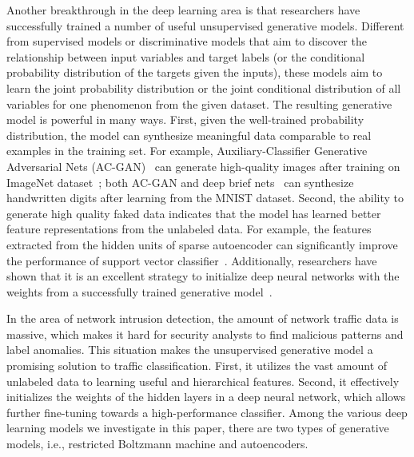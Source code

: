 Another breakthrough in the deep learning area is that researchers have successfully trained a number of useful unsupervised generative models.
Different from supervised models or discriminative models that aim to discover the relationship between input variables and target labels (or the conditional probability distribution of the targets given the inputs),
these models aim to learn the joint probability distribution or the joint conditional distribution of all variables for one phenomenon from the given dataset.
The resulting generative model is powerful in many ways.
First, given the well-trained probability distribution, the model can synthesize meaningful data comparable to real examples in the training set.
For example, Auxiliary-Classifier Generative Adversarial Nets (AC-GAN)~\cite{AC-GAN} can generate high-quality images after training on ImageNet dataset~\cite{ImageNet};
both AC-GAN and deep brief nets~\cite{DeepBeliefNets} can synthesize handwritten digits after learning from the MNIST dataset.
Second, the ability to generate high quality faked data indicates that
the model has learned better feature representations from the unlabeled data.
For example, the features extracted from the hidden units of sparse autoencoder can significantly improve the performance of support vector classifier~\cite{SparseAE}.
Additionally, researchers have shown that it is an excellent strategy to initialize deep neural networks with the weights from a successfully trained generative model~\cite{DeepBeliefNets, Momentum}.

In the area of network intrusion detection, the amount of network traffic data is massive,
which makes it hard for security analysts to find malicious patterns and label anomalies.
This situation makes the unsupervised generative model a promising solution
to traffic classification. %
First, it utilizes the vast amount of unlabeled data to learning useful and hierarchical features. Second, it effectively initializes the weights of the hidden layers in a deep neural network, which allows further fine-tuning towards a high-performance classifier.
Among the various deep learning models we investigate in this paper, there are two types of generative models, i.e., restricted Boltzmann machine and autoencoders.


